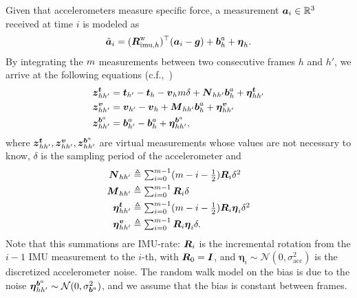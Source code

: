 Given that accelerometers measure specific force, a measurement $\boldsymbol a_i\in\mathbb{R}^3$ received at time $i$ is modeled as
\begin{equation}
\tilde{\boldsymbol a}_i = (\boldsymbol R^\text{w}_{\text{imu},h})^\top(\boldsymbol a_i - \boldsymbol g) + \boldsymbol b^a_h + \boldsymbol\eta_h.
\end{equation}
By integrating the $m$ measurements between two consecutive frames $h$ and $h'$, we arrive at the following equations (c.f.,~\cite[Appendix A]{Carlone2017})
\begin{align}
\boldsymbol z_{hh'}^{\boldsymbol t} &= \boldsymbol t_{h'} - \boldsymbol t_h - \boldsymbol v_hm\delta + \boldsymbol N_{hh'}\boldsymbol b^a_h + \boldsymbol\eta^{\boldsymbol t}_{hh'}\nonumber \\
\boldsymbol z_{hh'}^{\boldsymbol v} &= \boldsymbol v_{h'} - \boldsymbol v_h + \boldsymbol M_{hh'}\boldsymbol b^a_h + \boldsymbol\eta^{\boldsymbol v}_{hh'}\label{eqn:imu-sys} \\
\boldsymbol z_{hh'}^{\boldsymbol b^a} &= \boldsymbol b^a_{h'} - \boldsymbol b^a_h + \boldsymbol\eta^{\boldsymbol b^a}_{hh'}\nonumber,
\end{align}
where $\boldsymbol z_{hh'}^{\boldsymbol t}, \boldsymbol z_{hh'}^{\boldsymbol v}, \boldsymbol z_{hh'}^{\boldsymbol b^a}$ are virtual measurements whose values are not necessary to know, $\delta$ is the sampling period of the accelerometer and
\begin{align*}
\boldsymbol N_{hh'} &\triangleq \textstyle\sum_{i=0}^{m-1} (m - i - \frac{1}{2})\boldsymbol R_i\delta^2 \\
\boldsymbol M_{hh'} &\triangleq \textstyle\sum_{i=0}^{m-1} \boldsymbol R_i\delta \\
\boldsymbol\eta^{\boldsymbol t}_{hh'} &\triangleq \textstyle\sum_{i=0}^{m-1} (m - i - \frac{1}{2})\boldsymbol R_i\boldsymbol\eta_i\delta^2 \\
\boldsymbol\eta^{\boldsymbol v}_{hh'} &\triangleq \textstyle\sum_{i=0}^{m-1} \boldsymbol R_i\boldsymbol\eta_i\delta.
\end{align*}
Note that this summations are IMU-rate: $\boldsymbol R_i$ is the incremental rotation from the $i-1$ IMU measurement to the $i$-th, with $\boldsymbol R_0=\boldsymbol I$, and $\boldsymbol\eta_i\sim\mathcal{N}(0, \sigma^2_\text{acc})$ is the discretized accelerometer noise.
The random walk model on the bias is due to the noise $\boldsymbol\eta^{\boldsymbol b^a}_{hh'}\sim\mathcal{N}(0,\sigma^2_{\boldsymbol b^a})$, and we assume that the bias is constant between frames.


